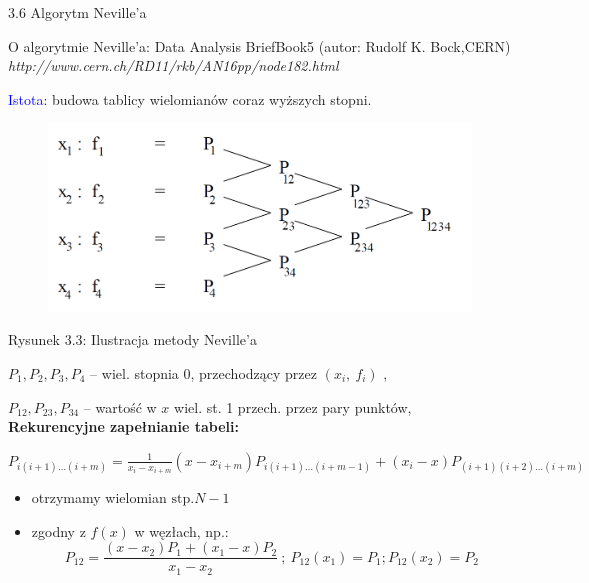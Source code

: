 \begin{frame}
{3.6 Algorytm Neville'a}

O algorytmie Neville'a: Data Analysis BriefBook5 (autor: Rudolf K. Bock,CERN)
{\it http://www.cern.ch/RD11/rkb/AN16pp/node182.html} \newline

\textcolor{blue}{Istota:} budowa tablicy wielomianów coraz wyższych stopni.
\begin{figure}[h]
			\includegraphics[scale = 0.28]{img/3/interpol_3_6}
	\end{figure}
Rysunek 3.3: Ilustracja metody Neville'a
\end{frame}

\begin{frame}
$P_{1}, P_{2}, P_{3}, P_{4}$ -- wiel. stopnia $0$, przechodzący przez $(x_{i},\ f_{i})$ ,

$P_{12}, P_{23}, P_{34}$ -- wartość w $x$ wiel. st. 1 przech. przez pary punktów, \\
\vspace{4mm}
\textbf{Rekurencyjne zapełnianie tabeli:}

$P_{i(i+1)\ldots(i+m)}=\displaystyle \frac{1}{x_{i}-x_{i+m}}(x-x_{i+m})P_{i(i+1)\ldots(i+m-1)}+(x_{i}-x)P_{(i+1)(i+2)\ldots(i+m)}$

\begin{itemize}
\item otrzymamy wielomian $\mathrm{s}\mathrm{t}\mathrm{p}. N-1$

\item zgodny z $f(x)$ w węzłach, np.:
$$
P_{12}=\frac{(x-x_{2})P_{1}+(x_{1}-x)P_{2}}{x_{1}-x_{2}}\ ;\ P_{12}(x_{1})=P_{1};P_{12}(x_{2})=P_{2}
$$

\end{itemize}

\end{frame}

